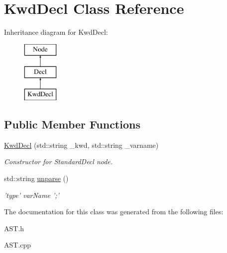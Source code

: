 \hypertarget{classKwdDecl}{\section{Kwd\-Decl Class Reference}
\label{classKwdDecl}
}
Inheritance diagram for Kwd\-Decl\-:\begin{figure}[H]
\begin{center}
\leavevmode
\includegraphics[height=3.000000cm]{classKwdDecl}
\end{center}
\end{figure}
\subsection*{Public Member Functions}
\begin{DoxyCompactItemize}
\item 
\hypertarget{classKwdDecl_a548853ecdec4124e22ab227e6ac96f43}{\hyperlink{classKwdDecl_a548853ecdec4124e22ab227e6ac96f43}{Kwd\-Decl} (std\-::string \-\_\-kwd, std\-::string \-\_\-varname)}\label{classKwdDecl_a548853ecdec4124e22ab227e6ac96f43}

\begin{DoxyCompactList}\small\item\em Constructor for Standard\-Decl node. \end{DoxyCompactList}\item 
\hypertarget{classKwdDecl_ac5f258785ee2a869413772b32c627973}{std\-::string \hyperlink{classKwdDecl_ac5f258785ee2a869413772b32c627973}{unparse} ()}\label{classKwdDecl_ac5f258785ee2a869413772b32c627973}

\begin{DoxyCompactList}\small\item\em 'type' var\-Name ';' \end{DoxyCompactList}\end{DoxyCompactItemize}


The documentation for this class was generated from the following files\-:\begin{DoxyCompactItemize}
\item 
A\-S\-T.\-h\item 
A\-S\-T.\-cpp\end{DoxyCompactItemize}
